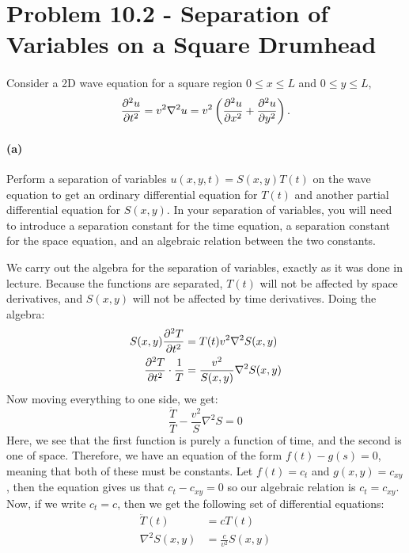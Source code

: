 \documentclass{article}
\begin{document}
\bigskip
\dphline
\pagebreak
\section*{Problem 10.2 - Separation of Variables on a Square Drumhead}

\paragraph{}
Consider a 2D wave equation for a square region $0\leq x \leq L$ and $0\leq y \leq L$,
	\begin{equation*}
		\frac{\partial^{2}{u}}{\partial{t}^{2}} = v^{2}\nabla^{2}u = v^{2}\left(\frac{\partial^{2}{u}}{\partial{x}^{2}}+\frac{\partial^{2}{u}}{\partial{y}^{2}}\right).
	\end{equation*}

\paragraph{(a)}
Perform a separation of variables $u(x,y,t) = S(x,y)T(t)$ on the wave equation to get an ordinary differential equation for $T(t)$ and another
partial differential equation for $S(x,y)$.  In your separation of variables, you will need to introduce a separation constant for the time equation, a separation constant
for the space equation, and an algebraic relation between the two constants.

\begin{solution}
	We carry out the algebra for the separation of variables, exactly as it was done in lecture. Because the 
	functions are separated, $T(t)$ will not be affected by space derivatives, and $S(x, y)$ will not be 
	affected by time derivatives. Doing the algebra:
	\begin{align*}
		S(x, y) \pdv[2]{T}{t}(t) &= T(t) v^2 \nabla^2 S(x, y) \\
		\pdv[2]{T}{t}(t) \cdot \frac{1}{T} &=  \frac{v^2}{S(x, y)}\nabla^2 S(x, y) 
	\end{align*}
	Now moving everything to one side, we get:
	\[
		\frac{\ddot T}{T} - \frac{v^2}{S}\nabla^2 S = 0
	\] 
	Here, we see that the first function is purely a function of time, and the second is one of space. 
	Therefore, we have an equation of the form $f(t) - g(s) = 0$, meaning that both of these must be constants.
	Let $f(t) = c_t$ and $g(x, y) = c_{xy}$, then the equation gives us that $c_t - c_{xy} = 0$ so our algebraic 
	relation is $c_t = c_{xy}$. Now, if we write $c_t = c$, then we get the following set of differential
	equations:
	\begin{align*}
		\ddot T(t) &= cT(t)\\
		\nabla^2 S(x, y) &= \frac{c}{v^2}S(x, y)
	\end{align*}
\end{solution}
\phline
\end{document}
